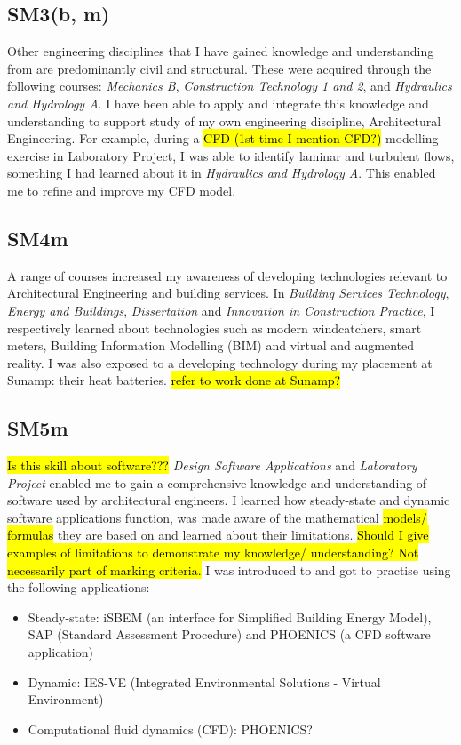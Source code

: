 \subsection*{SM3(b, m)}

Other engineering disciplines that I have gained knowledge and understanding from are predominantly civil and structural.
These were acquired through the following courses: \textit{Mechanics B}, \textit{Construction Technology 1 and 2},  and \textit{Hydraulics and Hydrology A}.
I have been able to apply and integrate this knowledge and understanding to support study of my own engineering discipline, Architectural Engineering.
For example, during a \hl{CFD (1st time I mention CFD?)} modelling exercise in Laboratory Project, I was able to identify laminar and turbulent flows, something I had learned about it in \textit{Hydraulics and Hydrology A}.
This enabled me to refine and improve my CFD model.


\subsection*{SM4m}

A range of courses increased my awareness of developing technologies relevant to Architectural Engineering and building services.
In \textit{Building Services Technology}, \textit{Energy and Buildings}, \textit{Dissertation} and \textit{Innovation in Construction Practice}, I respectively learned about technologies such as modern windcatchers, smart meters, Building Information Modelling (BIM) and virtual and augmented reality.
I was also exposed to a developing technology during my placement at Sunamp: their heat batteries.
\hl{refer to work done at Sunamp?}


\subsection*{SM5m}

\hl{Is this skill about software???}
\textit{Design Software Applications} and \textit{Laboratory Project} enabled me to gain a comprehensive knowledge and understanding of software used by architectural engineers.
I learned how steady-state and dynamic software applications function, was made aware of the mathematical \hl{models/ formulas} they are based on and learned about their limitations.
\hl{Should I give examples of limitations to demonstrate my knowledge/ understanding? Not necessarily part of marking criteria.}
I was introduced to and got to practise using the following applications:
\begin{itemize}
    \item Steady-state: iSBEM (an interface for Simplified Building Energy Model), SAP (Standard Assessment Procedure) and PHOENICS (a CFD software application)
    \item Dynamic: IES-VE (Integrated Environmental Solutions - Virtual Environment)
    \item Computational fluid dynamics (CFD): PHOENICS?
\end{itemize}

